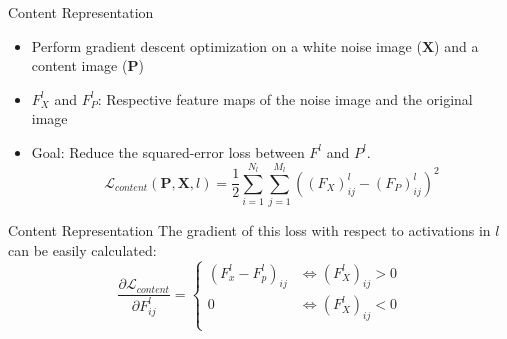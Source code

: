 \documentclass{beamer}
\begin{document}
\begin{frame}{Content Representation}
    \begin{itemize}
        \item Perform gradient descent optimization on a white noise image
            ($\mathbf{X}$) and a content image ($\mathbf{P}$)
        \item $F_X^l$ and $F_P^l$: Respective feature maps of the noise image
            and the original image
        \item Goal: Reduce the squared-error loss between $F^l$ and $P^l$.
    \begin{equation}
        \mathcal{L}_{content}(\mathbf{P}, \mathbf{X}, l) =
        \frac{1}{2} \sum_{i=1}^{N_l}\sum_{j=1}^{M_l}{((F_X)^l_{ij} - (F_P)^l_{ij})^2}
    \end{equation}
    \end{itemize}
\end{frame}



\begin{frame}{Content Representation}
    The gradient of this loss with respect to activations in $l$ can be easily
    calculated:
    \begin{equation}
        \frac{\partial \mathcal{L}_{content}}{\partial F^l_{ij}}
        =
        \begin{cases}
            (F^l_x - F^l_p)_{ij} & \iff (F^l_X)_{ij} > 0 \\
            0 & \iff (F^l_X)_{ij} < 0 \\
        \end{cases}
    \end{equation}
\end{frame}
\end{document}
